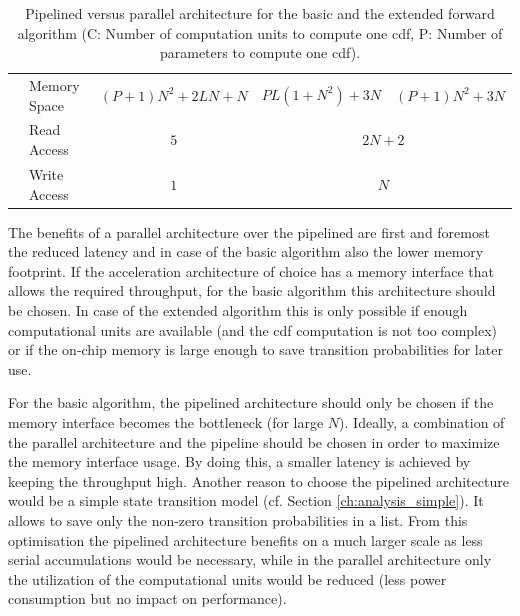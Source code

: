 \documentclass[mscthesis]{usiinfthesis}
\begin{document}
\begin{table}
\begin{center}
\begin{tabular}{|c|l|*{3}{c|}}
            \cline{2-5}
            & Memory Space
            & $(P+1)N^2+2LN+N$
            & $PL(1+N^2)+3N$ & $(P+1)N^2+3N$
            \\
            \cline{2-5}
            & Read Access
            & $5$
            & \multicolumn{2}{c|}{$2N+2$}
            \\
            \cline{2-5}
            & Write Access
            & $1$
            & \multicolumn{2}{c|}{$N$}
            \\
            \hline
        \end{tabular}
    \end{center}
    \caption{Pipelined versus parallel architecture for the basic and the
        extended forward algorithm (C: Number of computation units to compute
        one \acrshort{cdf}, P: Number of parameters to compute one
        \acrshort{cdf}).}
    \label{tab:summary_D}
\end{table}

The benefits of a parallel architecture over the pipelined are first and
foremost the reduced latency and in case of the basic algorithm also the lower
memory footprint. If the acceleration architecture of choice has a memory
interface that allows the required throughput, for the basic algorithm this
architecture should be chosen. In case of the extended algorithm this is only
possible if enough computational units are available (and the \gls{cdf}
computation is not too complex) or if the on-chip memory is large enough to
save transition probabilities for later use.

For the basic algorithm, the pipelined architecture should only be chosen if
the memory interface becomes the bottleneck (for large $N$). Ideally,
a combination of the parallel architecture and the pipeline should be chosen in
order to maximize the memory interface usage. By doing this, a smaller latency
is achieved by keeping the throughput high. Another reason to choose the
pipelined architecture would be a simple state transition model (cf. Section
\ref{ch:analysis_simple}). It allows to save only the non-zero transition
probabilities in a list. From this optimisation the pipelined architecture
benefits on a much larger scale as less serial accumulations would be
necessary, while in the parallel architecture only the utilization of the
computational units would be reduced (less power consumption but no impact on
performance).
\end{document}
